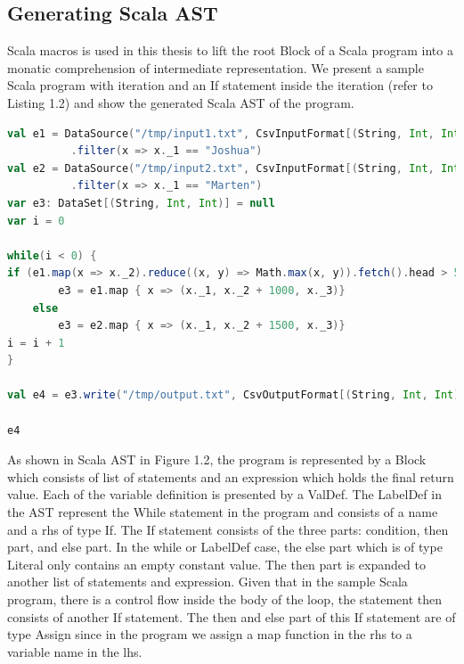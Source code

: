 \subsection{Generating Scala AST}
Scala macros is used in this thesis to lift the root Block of a Scala program into a monatic comprehension of intermediate representation. We present a sample Scala program with iteration and an If statement inside the iteration (refer to Listing 1.2) and show the generated Scala AST of the program. 
\\
\begin{lstlisting}[language=scala, caption=Workflow with Conditional, label = workflow2]
val e1 = DataSource("/tmp/input1.txt", CsvInputFormat[(String, Int, Int)]())
          .filter(x => x._1 == "Joshua")
val e2 = DataSource("/tmp/input2.txt", CsvInputFormat[(String, Int, Int)]())
          .filter(x => x._1 == "Marten")
var e3: DataSet[(String, Int, Int)] = null
var i = 0

while(i < 0) {
if (e1.map(x => x._2).reduce((x, y) => Math.max(x, y)).fetch().head > 50)
        e3 = e1.map { x => (x._1, x._2 + 1000, x._3)}
    else
    	e3 = e2.map { x => (x._1, x._2 + 1500, x._3)}
i = i + 1
}

val e4 = e3.write("/tmp/output.txt", CsvOutputFormat[(String, Int, Int)]())

e4
\end{lstlisting}

As shown in Scala AST in Figure 1.2, the program is represented by a Block which consists of list of statements and an expression which holds the final return value. Each of the variable definition is presented by a ValDef. The LabelDef in the AST represent the While statement in the program and consists of a name and a rhs of type If. The If statement consists of the three parts: condition, then part, and else part. In the while or LabelDef case, the else part which is of type Literal only contains an empty constant value. The then part is expanded to another list of statements and expression. Given that in the sample Scala program, there is a control flow inside the body of the loop, the statement then consists of another If statement. The then and else part of this If statement are of type Assign since in the program we assign a map function in the rhs to a variable name in the lhs. 

